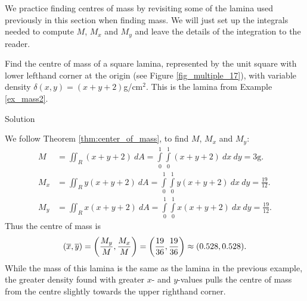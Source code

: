 We  practice  finding centres of mass by revisiting some of the lamina used previously in this section when finding mass. We will  just set up the integrals needed to compute $M$, $M_x$ and $M_y$ and leave the details of the integration to the reader.

\begin{example}
Find the centre of mass of a square lamina, represented by the unit square with lower lefthand corner at the origin (see Figure \ref{fig_multiple_17}), with variable density $\delta(x,y) = (x+y+2)$g/cm$^2$. This is the lamina from Example \ref{ex_mass2}.

Solution 

We follow Theorem \ref{thm:center_of_mass}, to find $M$, $M_x$ and $M_y$:
\begin{align*}
M &= \iint_R (x+y+2)\ dA = \int\limits_0^1\int\limits_0^1 (x+y+2)\ dx\ dy =3\text{g}.\\
M_x &= \iint_R y(x+y+2)\ dA = \int\limits_0^1\int\limits_0^1 y(x+y+2)\ dx\ dy =\frac{19}{12}.\\
M_y &= \iint_R x(x+y+2)\ dA = \int\limits_0^1\int\limits_0^1 x(x+y+2)\ dx\ dy =\frac{19}{12}.
\end{align*}
Thus the centre of mass is $$\displaystyle (\overline{x},\overline{y}) = \left(\frac{M_y}M,\frac{M_x}M\right) = \left(\frac{19}{36},\frac{19}{36}\right) \approx (0.528,0.528).$$ While the mass of this lamina is the same as the lamina in the previous example, the greater density found with greater $x$- and $y$-values pulls the centre of mass from the centre slightly towards the upper righthand corner.
\end{example}

